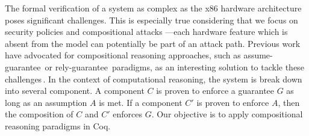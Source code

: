 The formal verification of a system as complex as the x86 hardware architecture
poses significant challenges.
%
This is especially true considering that we focus on security policies and
compositional attacks ---each hardware feature which is absent from the model
can potentially be part of an attack path.
%
Previous work have advocated for compositional reasoning approaches, such as
assume-guarantee\,\cite{pnueli1985ag} or
rely-guarantee\,\cite{jones1983tentative} paradigms, as an interesting solution
to tackle these challenges\,\cite{garg2010compositional,heyman2012securemodel}.
%
In the context of computational reasoning, the system is break down into several
component.
%
A component \( C \) is proven to enforce a guarantee \( G \) as long as an
assumption \( A \) is met.
%
If a component \( C' \) is proven to enforce \( A \), then the composition of
\( C \) and \( C' \) enforces \( G \).
%
Our objective is to apply compositional reasoning paradigms in Coq.


